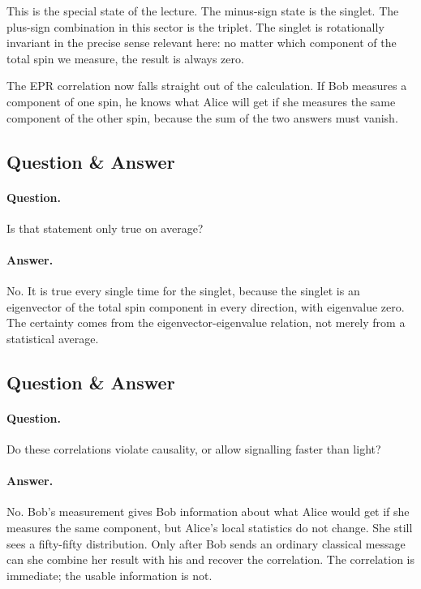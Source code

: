This is the special state of the lecture. The minus-sign state is the singlet. The plus-sign combination in this sector is the triplet. The singlet is rotationally invariant in the precise sense relevant here: no matter which component of the total spin we measure, the result is always zero.

The EPR correlation now falls straight out of the calculation. If Bob measures a component of one spin, he knows what Alice will get if she measures the same component of the other spin, because the sum of the two answers must vanish.

\subsection{Question \& Answer}

\paragraph{Question.} Is that statement only true on average?

\paragraph{Answer.} No. It is true every single time for the singlet, because the singlet is an eigenvector of the total spin component in every direction, with eigenvalue zero. The certainty comes from the eigenvector-eigenvalue relation, not merely from a statistical average.

\subsection{Question \& Answer}

\paragraph{Question.} Do these correlations violate causality, or allow signalling faster than light?

\paragraph{Answer.} No. Bob's measurement gives Bob information about what Alice would get if she measures the same component, but Alice's local statistics do not change. She still sees a fifty-fifty distribution. Only after Bob sends an ordinary classical message can she combine her result with his and recover the correlation. The correlation is immediate; the usable information is not.


